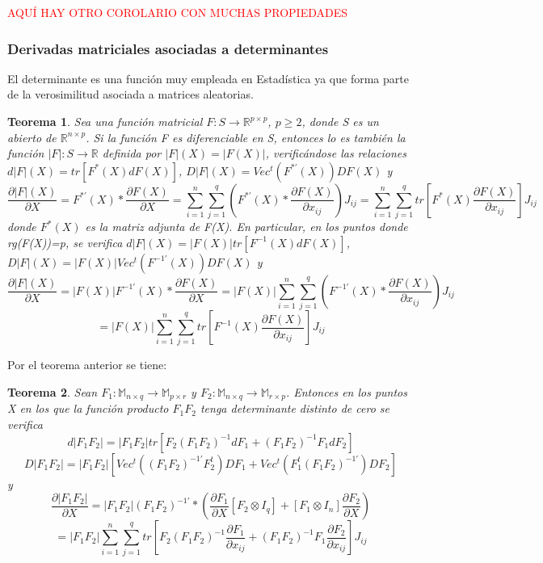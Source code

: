 \documentclass{article}
\theoremstyle{theorem-style}  %
\newtheorem{theorem}{Teorema}[section]  %
\theoremstyle{definition-style}
\theoremstyle{example-style}
\theoremstyle{exercise-style}
\begin{document}
	\textcolor{red}{AQUÍ HAY OTRO COROLARIO CON MUCHAS PROPIEDADES}
	
	\subsubsection*{Derivadas matriciales asociadas a determinantes}
	
	El determinante es una función muy empleada en Estadística ya que forma parte de la verosimilitud asociada a matrices aleatorias.
	
	\begin{theorem}
		Sea una función matricial $F: S\rightarrow \mathbb{R}^{p\times p}$, $p \geq 2$, donde S es un abierto de $\mathbb{R}^{n\times p}$. Si la función F es diferenciable en S, entonces lo es también la función $|F|:S\rightarrow \mathbb{R}$ definida por $|F|(X)=|F(X)|$, verificándose las relaciones $d|F|(X) = tr[F^*(X)dF(X)]$, $D|F|(X)=Vec^t(F^{*'}(X))DF(X)$ y $$\frac{\partial |F|(X)}{\partial X} = F^{*'}(X) * \frac{\partial F(X)}{\partial X} = \sum_{i=1}^{n} \sum_{j=1}^{q} \left( F^{*'}(X) *  \frac{\partial F(X)}{\partial x_{ij}} \right)J_{ij} = \sum_{i=1}^{n} \sum_{j=1}^{q} tr \left[ F^*(X)\frac{\partial F(X)}{\partial x_{ij}} \right]J_{ij}$$
		donde $F^*(X)$ es la matriz adjunta de F(X). En particular, en los puntos donde rg(F(X))=p, se verifica $d|F|(X)=|F(X)|tr[F^{-1}(X)dF(X)]$, $D|F|(X)=|F(X)|Vec^t(F^{-1'}(X))DF(X)$ y $$\frac{\partial |F|(X)}{\partial X} = |F(X)|F^{-1'}(X)*\frac{\partial F(X)}{\partial X} = |F(X)|\sum_{i=1}^n \sum_{j=1}^q \left( F^{-1'}(X)* \frac{\partial F(X)}{\partial x_{ij}} \right)J_{ij} $$ $$= |F(X)|\sum_{i=1}^n \sum_{j=1}^q tr\left[F^{-1}(X) \frac{\partial F(X)}{\partial x_{ij}} \right]J_{ij}$$
	\end{theorem}
	
	Por el teorema anterior se tiene:
	
	\begin{theorem}
		Sean $F_1: \mathbb{M}_{n\times q} \rightarrow \mathbb{M}_{p\times r}$ y $F_2: \mathbb{M}_{n\times q} \rightarrow \mathbb{M}_{r\times p}$. Entonces en los puntos X en los que la función producto $F_1F_2$ tenga determinante distinto de cero se verifica $$d|F_1F_2|=|F_1F_2|tr[F_2(F_1F_2)^{-1}dF_1+(F_1F_2)^{-1}F_1dF_2]$$
		$$D|F_1F_2|=|F_1F_2|\left[Vec^t\left( (F_1F_2)^{-1'} F_2^t\right)DF_1 + Vec^t\left(F_1^t(F_1F_2)^{-1'}\right)DF_2\right]$$
		y
		$$\frac{\partial |F_1F_2|}{\partial X} = |F_1F_2|(F_1F_2)^{-1'}* \left( \frac{\partial F_1}{\partial X}[F_2 \otimes I_q] + [F_1 \otimes I_n]\frac{\partial F_2}{\partial X} \right)$$
		$$= |F_1F_2|\sum_{i=1}^n \sum_{j=1}^q tr \left[ F_2(F_1F_2)^{-1}\frac{\partial F_1}{\partial x_{ij}} + (F_1F_2)^{-1}F_1\frac{\partial F_2}{\partial x_{ij}} \right]J_{ij}$$
	\end{theorem}
	
\end{document}

